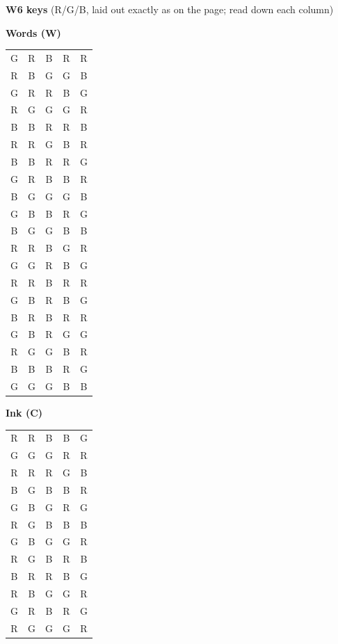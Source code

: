 \documentclass[10pt,a4paper]{article}
\begin{document}
\textbf{W6 keys} (R/G/B, laid out exactly as on the page; read down each column)\par\medskip\begin{minipage}[t]{0.3\linewidth}\centering\textbf{Words (W)}\\[2pt]\ttfamily\footnotesize\begin{tabular}{ccccc}G & R & B & R & R\\
R & B & G & G & B\\
G & R & R & B & G\\
R & G & G & G & R\\
B & B & R & R & B\\
R & R & G & B & R\\
B & B & R & R & G\\
G & R & B & B & R\\
B & G & G & G & B\\
G & B & B & R & G\\
B & G & G & B & B\\
R & R & B & G & R\\
G & G & R & B & G\\
R & R & B & R & R\\
G & B & R & B & G\\
B & R & B & R & R\\
G & B & R & G & G\\
R & G & G & B & R\\
B & B & B & R & G\\
G & G & G & B & B\\\end{tabular}\end{minipage}\hfill\begin{minipage}[t]{0.3\linewidth}\centering\textbf{Ink (C)}\\[2pt]\ttfamily\footnotesize\begin{tabular}{ccccc}R & R & B & B & G\\
G & G & G & R & R\\
R & R & R & G & B\\
B & G & B & B & R\\
G & B & G & R & G\\
R & G & B & B & B\\
G & B & G & G & R\\
R & G & B & R & B\\
B & R & R & B & G\\
R & B & G & G & R\\
G & R & B & R & G\\
R & G & G & G & R\\

\end{tabular}
\end{minipage}
\end{document}
